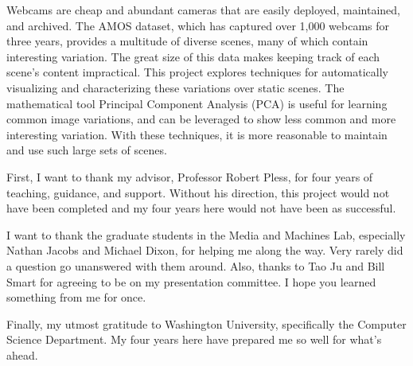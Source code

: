 %

\begin{thesistitlepage}               %
\end{thesistitlepage}

\begin{thesisabstract}
Webcams are cheap and abundant cameras that are easily deployed, maintained, and archived.  The AMOS dataset, which has captured over 1,000 webcams for three years, provides a multitude of diverse scenes, many of which contain interesting variation.  The great size of this data makes keeping track of each scene's content impractical.  This project explores techniques for automatically visualizing and characterizing these variations over static scenes.  The mathematical tool Principal Component Analysis (PCA) is useful for learning common image variations, and can be leveraged to show less common and more interesting variation.  With these techniques, it is more reasonable to maintain and use such large sets of scenes.
\end{thesisabstract}

\begin{thesisacknowledgments}

First, I want to thank my advisor, Professor Robert Pless, for four years of teaching, guidance, and support.  Without his direction, this project would not have been completed and my four years here would not have been as successful.

I want to thank the graduate students in the Media and Machines Lab, especially Nathan Jacobs and Michael Dixon, for helping me along the way.  Very rarely did a question go unanswered with them around.  Also, thanks to Tao Ju and Bill Smart for agreeing to be on my presentation committee.  I hope you learned something from me for once.

Finally, my utmost gratitude to Washington University, specifically the Computer Science Department.  My four years here have prepared me so well for what's ahead.

\end{thesisacknowledgments}


\begin{singlespace}
\tableofcontents



\listoffigures
\end{singlespace}

